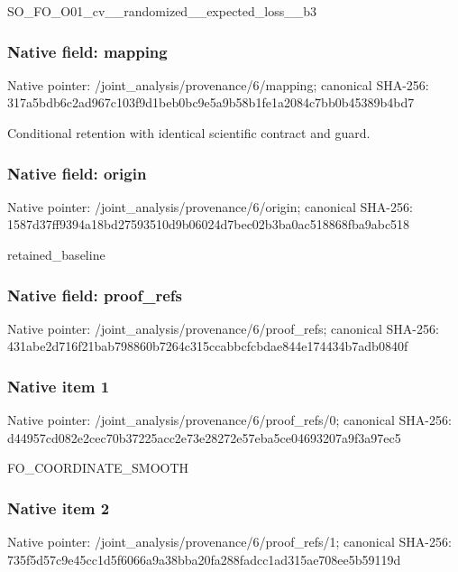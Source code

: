 \documentclass[10pt,a4paper]{article}
\begin{document}
\begingroup\raggedright\sloppy SO\_\allowbreak{}FO\_\allowbreak{}O01\_\allowbreak{}cv\_\allowbreak{}\_\allowbreak{}randomized\_\allowbreak{}\_\allowbreak{}expected\_\allowbreak{}loss\_\allowbreak{}\_\allowbreak{}b3\par\endgroup

\subsubsection{Native field: mapping}
Native pointer: /joint\_\allowbreak{}analysis/provenance/6/mapping; canonical SHA-256: 317a5bdb6c2ad967c103f9d1beb0bc9e5a9b58b1fe1a2084c7bb0b45389b4bd7

\begingroup\raggedright\sloppy Conditional retention with identical scientific contract and guard.\par\endgroup

\subsubsection{Native field: origin}
Native pointer: /joint\_\allowbreak{}analysis/provenance/6/origin; canonical SHA-256: 1587d37ff9394a18bd27593510d9b06024d7bec02b3ba0ac518868fba9abc518

\begingroup\raggedright\sloppy retained\_\allowbreak{}baseline\par\endgroup

\subsubsection{Native field: proof\_\allowbreak{}refs}
Native pointer: /joint\_\allowbreak{}analysis/provenance/6/proof\_\allowbreak{}refs; canonical SHA-256: 431abe2d716f21bab798860b7264c315ccabbcfcbdae844e174434b7adb0840f

\subsubsection{Native item 1}
Native pointer: /joint\_\allowbreak{}analysis/provenance/6/proof\_\allowbreak{}refs/0; canonical SHA-256: d44957cd082e2cec70b37225acc2e73e28272e57eba5ce04693207a9f3a97ec5

\begingroup\raggedright\sloppy FO\_\allowbreak{}COORDINATE\_\allowbreak{}SMOOTH\par\endgroup

\subsubsection{Native item 2}
Native pointer: /joint\_\allowbreak{}analysis/provenance/6/proof\_\allowbreak{}refs/1; canonical SHA-256: 735f5d57c9e45cc1d5f6066a9a38bba20fa288fadcc1ad315ae708ee5b59119d
\end{document}
